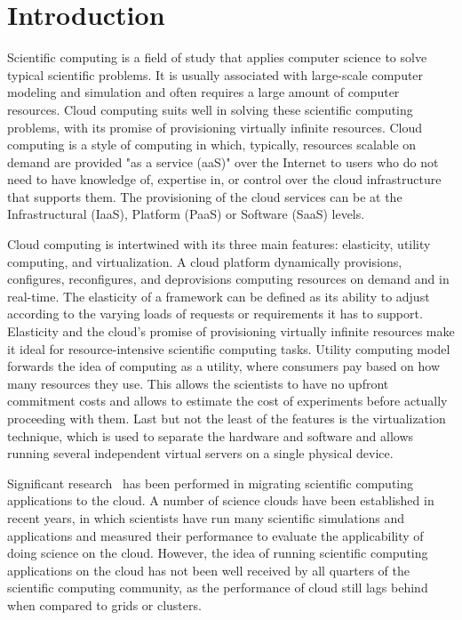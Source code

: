 \documentclass[a4paper,10pt]{article}
\begin{document}
\section{Introduction}

Scientific computing is a field of study that applies computer science to solve typical scientific problems. It is usually associated with large-scale computer modeling and simulation and often requires a large amount of computer resources. Cloud computing \cite{ArmbrustETAL:AboveCloud.09} suits well in solving these scientific computing problems, with its promise of provisioning virtually infinite resources.  Cloud computing is a style of computing in which, typically, resources scalable on demand are provided "as a service (aaS)" over the Internet to users who do not need to have knowledge of, expertise in, or control over the cloud infrastructure that supports them. The provisioning of the cloud services can be at the Infrastructural (IaaS), Platform (PaaS) or Software (SaaS) levels.



Cloud computing is intertwined with its three main features: elasticity, utility computing, and virtualization. A cloud platform dynamically provisions, configures, reconfigures, and deprovisions computing resources on demand and in real-time. The elasticity of a framework can be defined as its ability to adjust according to the varying loads of requests or requirements it has to support. Elasticity and the cloud's promise of provisioning virtually infinite resources make it ideal for resource-intensive scientific computing tasks. Utility computing model forwards the idea of computing as a utility, where consumers pay based on how many resources they use. This allows the scientists to have no upfront commitment costs and allows to estimate the cost of experiments before actually proceeding with them. Last but not the least of the features is the virtualization \cite{Barham:2003:XAV:1165389.945462} technique, which is used to separate the hardware and software and allows running several independent virtual servers on a single physical device. 

Significant research~\cite{srirama2011scalability, mapscale, buyya.2009} has been performed in migrating scientific computing applications to the cloud. A number of science clouds \cite{HelixNebula.13, SriramaETAL:SciCloud.10, FutureGrid.13} have been established in recent years, in which scientists have run many scientific simulations and applications and measured their performance to evaluate the applicability of doing science on the cloud. However, the idea of running scientific computing applications on the cloud has not been well received by all quarters of the scientific computing community, as the performance of cloud still lags behind when compared to grids or clusters. 
\end{document}
